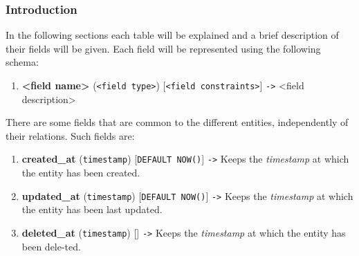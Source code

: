 \documentclass[a4paper, 12pt, oneside]{book}
\begin{document}
\subsubsection{Introduction}
In the following sections each table will be explained and a brief description of their fields will be given. Each field will be represented using the following schema:
\begin{enumerate}[label = -]
	\item \textbf{<field name>} (\texttt{<field type>}) [\texttt{<field constraints>}] \texttt{->} <field description>
\end{enumerate}
There are some fields that are common to the different entities, independently of their relations. Such fields are:
\begin{enumerate}[label = -]
	\item \textbf{created\_at} (\texttt{timestamp}) [\texttt{DEFAULT NOW()}] \texttt{->} Keeps the \emph{timestamp} at which the entity has been created.
	\item \textbf{updated\_at} (\texttt{timestamp}) [\texttt{DEFAULT NOW()}] \texttt{->} Keeps the \emph{timestamp} at which the entity has been last updated.
	\item \textbf{deleted\_at} (\texttt{timestamp}) [] \texttt{->} Keeps the \emph{timestamp} at which the entity has been dele-ted.
\end{enumerate}
\end{document}
